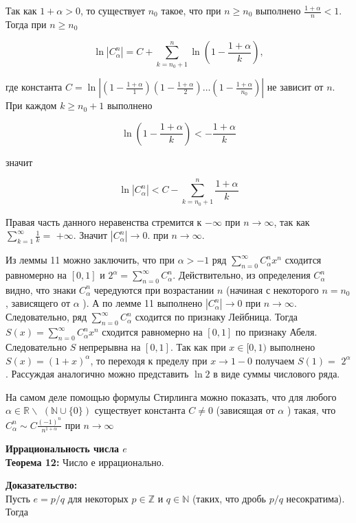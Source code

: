 \documentclass[a4paper,12pt]{article} %
\begin{document}
Так как $1+\alpha>0$, то существует $n_{0}$ такое, что при $n \geq n_{0}$ выполнено $\frac{1+\alpha}{n}<1$. Тогда при $n \geq n_{0}$

$$
\ln \left|C_{\alpha}^{n}\right|=C+\sum_{k=n_{0}+1}^{n} \ln \left(1-\frac{1+\alpha}{k}\right),
$$

где константа $C=\ln \left|\left(1-\frac{1+\alpha}{1}\right)\left(1-\frac{1+\alpha}{2}\right) \ldots\left(1-\frac{1+\alpha}{n_{0}}\right)\right|$ не зависит от $n$. При каждом $k \geq n_{0}+1$ выполнено

$$
\ln \left(1-\frac{1+\alpha}{k}\right)<-\frac{1+\alpha}{k}
$$

значит

$$
\ln \left|C_{\alpha}^{n}\right|<C-\sum_{k=n_{0}+1}^{n} \frac{1+\alpha}{k}
$$

Правая часть данного неравенства стремится к $-\infty$ при $n \rightarrow \infty$, так как $\sum_{k=1}^{\infty} \frac{1}{k}=$ $+\infty$. Значит $\left|C_{\alpha}^{n}\right| \rightarrow 0$. при $n \rightarrow \infty$.

Из леммы 11 можно заключить, что при $\alpha>-1$ ряд $\sum_{n=0}^{\infty} C_{\alpha}^{n} x^{n}$ сходится равномерно на $[0,1]$ и $2^{\alpha}=\sum_{n=0}^{\infty} C_{\alpha}^{n}$. Действительно, из определения $C_{\alpha}^{n}$ видно, что знаки $C_{\alpha}^{n}$ чередуются при возрастании $n$ (начиная с некоторого $n=n_{0}$, зависящего от $\alpha$ ). А по лемме 11 выполнено $\left|C_{\alpha}^{n}\right| \rightarrow 0$ при $n \rightarrow \infty$. Следовательно, ряд $\sum_{n=0}^{\infty} C_{\alpha}^{n}$ сходится по признаку Лейбница. Тогда $S(x)=\sum_{n=0}^{\infty} C_{\alpha}^{n} x^{n}$ сходится равномерно на $[0,1]$ по признаку Абеля. Следовательно $S$ непрерывна на $[0,1]$. Так как при $x \in[0,1)$ выполнено $S(x)=(1+x)^{\alpha}$, то переходя к пределу при $x \rightarrow 1-0$ получаем $S(1)=$ $2^{\alpha}$. Рассуждая аналогично можно представить $\ln 2$ в виде суммы числового ряда.

На самом деле помощью формулы Стирлинга можно показать, что для любого $\alpha \in \mathbb{R} \backslash$ $(\mathbb{N} \cup\{0\})$ существует константа $C \neq 0$ (зависящая от $\alpha$ ) такая, что $C_{\alpha}^{n} \sim C \frac{(-1)^{n}}{n^{1+\alpha}}$ при $n \rightarrow \infty$

\textbf{Иррациональность числа $e$}\\
\textbf{Теорема 12:} Число е иррационально.

\textbf{Доказательство:}\\
Пусть $e=p / q$ для некоторых $p \in \mathbb{Z}$ и $q \in \mathbb{N}$ (таких, что дробь $p / q$ несократима). Тогда
\end{document}
